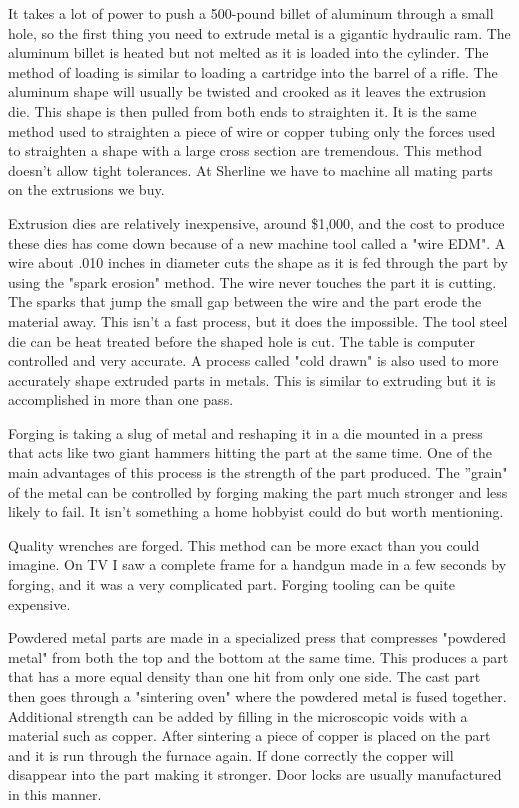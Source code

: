 It takes a lot of power to push a 500-pound billet of aluminum through a small
hole, so the first thing you need to extrude metal is a gigantic hydraulic ram.
The aluminum billet is heated but not melted as it is loaded into the cylinder.
The method of loading is similar to loading a cartridge into the barrel of a
rifle. The aluminum shape will usually be twisted and crooked as it leaves the
extrusion die. This shape is then pulled from both ends to straighten it. It is
the same method used to straighten a piece of wire or copper tubing only the
forces used to straighten a shape with a large cross section are tremendous.
This method doesn't allow tight tolerances. At Sherline we have to machine all
mating parts on the extrusions we buy.

Extrusion dies are relatively inexpensive, around \$1,000, and the cost to
produce these dies has come down because of a new machine tool called a "wire
EDM". A wire about .010 inches in diameter cuts the shape as it is fed through
the part by using the "spark erosion" method. The wire never touches the part it
is cutting. The sparks that jump the small gap between the wire and the part
erode the material away. This isn't a fast process, but it does the impossible.
The tool steel die can be heat treated before the shaped hole is cut. The table
is computer controlled and very accurate. A process called "cold drawn" is also
used to more accurately shape extruded parts in metals. This is similar to
extruding but it is accomplished in more than one pass.


Forging is taking a slug of metal and reshaping it in a die mounted in a press
that acts like two giant hammers hitting the part at the same time. One of the
main advantages of this process is the strength of the part produced. The
''grain" of the metal can be controlled by forging making the part much stronger
and less likely to fail. It isn't something a home hobbyist could do but worth
mentioning.

Quality wrenches are forged. This method can be more exact than you could
imagine. On TV I saw a complete frame for a handgun made in a few seconds by
forging, and it was a very complicated part. Forging tooling can be quite
expensive.


Powdered metal parts are made in a specialized press that compresses "powdered
metal" from both the top and the bottom at the same time. This produces a part
that has a more equal density than one hit from only one side. The cast part
then goes through a "sintering oven" where the powdered metal is fused together.
Additional strength can be added by filling in the microscopic voids with a
material such as copper. After sintering a piece of copper is placed on the part
and it is run through the furnace again. If done correctly the copper will
disappear into the part making it stronger. Door locks are usually manufactured
in this manner.


